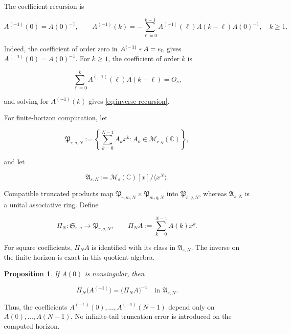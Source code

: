 \documentclass[3p,12pt,authoryear]{elsarticle}
\newtheorem{proposition}[theorem]{Proposition}
\theoremstyle{definition}
\theoremstyle{remark}
\newcommand{\C}{\mathbb C}
\newcommand{\ez}{e_{\mathstrut 0}}
\begin{document}
The coefficient recursion is

\begin{equation}\label{eq:inverse-recursion}
A^{(-1)}(0)=A(0)^{-1},
\qquad
A^{(-1)}(k)
=-\sum_{\ell=0}^{k-1}A^{(-1)}(\ell)A(k-\ell)A(0)^{-1},
\quad k\geq1.
\end{equation}

Indeed, the coefficient of order zero in $A^{(-1)}*A=\ez$ gives $A^{(-1)}(0)=A(0)^{-1}$. For $k\geq1$, the coefficient of order $k$ is

\begin{equation*}
\sum_{\ell=0}^{k}A^{(-1)}(\ell)A(k-\ell)=O_s,
\end{equation*}

and solving for $A^{(-1)}(k)$ gives \eqref{eq:inverse-recursion}.

For finite-horizon computation, let

\begin{equation*}
\mathfrak P_{r,q,N}
:=
\left\{
\sum_{k=0}^{N-1}A_kx^k:A_k\in\mathcal M_{r,q}(\C)
\right\},
\end{equation*}

and let

\begin{equation*}
\mathfrak A_{s,N}
:=
\mathcal M_s(\C)[x]/\langle x^N\rangle.
\end{equation*}

Compatible truncated products map $\mathfrak P_{r,m,N}\times\mathfrak P_{m,q,N}$ into $\mathfrak P_{r,q,N}$, whereas $\mathfrak A_{s,N}$ is a unital associative ring. Define

\begin{equation*}
\Pi_N:\mathfrak S_{r,q}\longrightarrow\mathfrak P_{r,q,N},
\qquad
\Pi_NA:=\sum_{k=0}^{N-1}A(k)x^k.
\end{equation*}

For square coefficients, $\Pi_NA$ is identified with its class in $\mathfrak A_{s,N}$. The inverse on the finite horizon is exact in this quotient algebra.

\begin{proposition}\label{prop:finite-horizon}
If $A(0)$ is nonsingular, then

\begin{equation}\label{eq:finite-horizon}
\Pi_N\bigl(A^{(-1)}\bigr)
=
\bigl(\Pi_NA\bigr)^{-1}
\quad\text{in }\mathfrak A_{s,N}.
\end{equation}
\end{proposition}

Thus, the coefficients $A^{(-1)}(0),\ldots,A^{(-1)}(N-1)$ depend only on $A(0),\ldots,A(N-1)$. No infinite-tail truncation error is introduced on the computed horizon.
\end{document}
